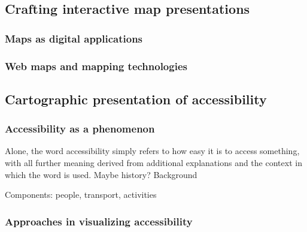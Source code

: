 \textcite{rot2013a, rot2013b}

\subsection{Crafting interactive map presentations}
\subsubsection{Maps as digital applications}

\subsubsection{Web maps and mapping technologies}



\subsection{Cartographic presentation of accessibility}

\subsubsection{Accessibility as a phenomenon}

Alone, the word accessibility simply refers to how easy it is to access something,
with all further meaning derived from
additional explanations and the context in which the word is used.
Maybe history? Background \parencite{ten2020}

Components: people, transport, activities \parencite{jar2018}




\subsubsection{Approaches in visualizing accessibility}

